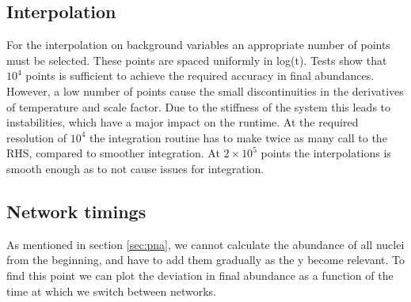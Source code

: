 \subsection{Interpolation}
\label{sec:interpolation}
For the interpolation on background variables an appropriate number of points must be selected. These points are spaced uniformly in log(t). Tests show that $10^4$ points is sufficient to achieve the required accuracy in final abundances. However, a low number of points cause the small discontinuities in the derivatives of temperature and scale factor. Due to the stiffness of the system this leads to instabilities, which have a major impact on the runtime. At the required resolution of $10^4$ the integration routine has to make twice as many call to the RHS, compared to smoother integration. At $2\times 10^5$ points the interpolations is smooth enough as to not cause issues for integration.


\subsection{Network timings}
As  mentioned in section \ref{sec:pna}, we cannot calculate the abundance of all nuclei from the beginning, and have to add them gradually as the y become relevant. To find this point we can plot the deviation in final abundance as a function of the time at which we switch between networks.
